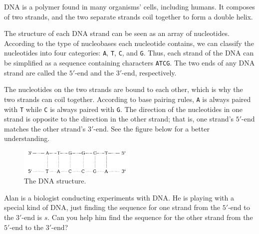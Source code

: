 DNA is a polymer found in many organisms' cells, including humans.
It composes of two strands, and the two separate strands coil together to form a double helix.

The structure of each DNA strand can be seen as an array of nucleotides.
According to the type of nucleobases each nucleotide contains, we can classify the nucleotides into four categories: \texttt{A}, \texttt{T}, \texttt{C}, and \texttt{G}.
Thus, each strand of the DNA can be simplified as a sequence containing characters \texttt{ATCG}.
The two ends of any DNA strand are called the $5'$-end and the $3'$-end, respectively.

The nucleotides on the two strands are bound to each other, which is why the two strands can coil together.
According to base pairing rules, \texttt{A} is always paired with \texttt{T} while \texttt{C} is always paired with \texttt{G}.
The direction of the nucleotides in one strand is opposite to the direction in the other strand;
that is, one strand's $5'$-end matches the other strand's $3'$-end.
See the figure below for a better understanding.

\begin{figure}[h]
\center
\includegraphics[width=0.5\textwidth]{image/dna.png}
\caption{The DNA structure.}
\end{figure}
    

Alan is a biologist conducting experiments with DNA.
He is playing with a special kind of DNA, just finding the sequence for one strand from the $5'$-end to the $3'$-end is $s$.
Can you help him find the sequence for the other strand from the $5'$-end to the $3'$-end? 